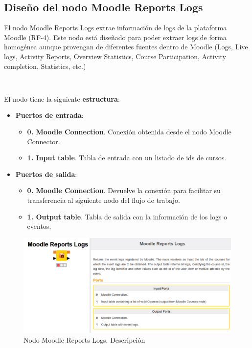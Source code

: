 \newpage
\subsection{Diseño del nodo Moodle Reports Logs}

El nodo Moodle Reports Logs extrae información de logs de la plataforma Moodle (RF-4). 
Este nodo está diseñado para poder extraer logs de forma homogénea aunque provengan de diferentes
fuentes dentro de Moodle (Logs, Live logs, Activity Reports, Overview Statistics, Course Participation, Activity completion, Statistics, etc.)

\

El nodo tiene la siguiente \textbf{estructura}:

\begin{itemize}
	\item \textbf{Puertos de entrada}: 
    \begin{itemize}
		\item \textbf{0. Moodle Connection}. Conexión obtenida desde el nodo Moodle Connector. 
		\item \textbf{1. Input table}. Tabla de entrada con un listado de ids de cursos. 
   	\end{itemize}

	\item \textbf{Puertos de salida}: 
    \begin{itemize}
		\item \textbf{0. Moodle Connection}. Devuelve la conexión para facilitar su transferencia al siguiente nodo del flujo de trabajo. 
		\item \textbf{1. Output table}. Tabla de salida con la información de los logs o eventos. 
   	\end{itemize}

\end{itemize}

\begin{figure}[!h]
	\centering
	\includegraphics[width=1\textwidth]{img/nodes_moodle_reports_logs.png}
	\caption{Nodo Moodle Reports Logs. Descripción}
	\label{fig:moodlereportslogs}
\end{figure}
\FloatBarrier

